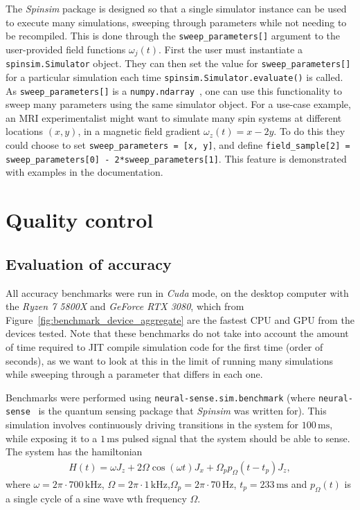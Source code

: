 \documentclass{jors}
\begin{document}
		The \emph{Spinsim} package is designed so that a single simulator instance can be used to execute many simulations, sweeping through parameters while not needing to be recompiled.
		This is done through the \texttt{sweep\_parameters[]} argument to the user-provided field functions $ \omega_j(t) $.
		First the user must instantiate a \texttt{spinsim.Simulator} object.
		They can then set the value for \texttt{sweep\_parameters[]} for a particular simulation each time \texttt{spinsim.Simulator.evaluate()} is called.
		As \texttt{sweep\_parameters[]} is a \texttt{numpy.ndarray}~\cite{harris_array_2020}, one can use this functionality to sweep many parameters using the same simulator object.
		For a use-case example, an MRI experimentalist might want to simulate many spin systems at different locations $ (x, y) $, in a magnetic field gradient $ \omega_z(t) = x - 2 y $.
		To do this they could choose to set \texttt{sweep\_parameters = [x, y]}, and define \texttt{field\_sample[2] = sweep\_parameters[0] - 2*sweep\_parameters[1]}.%
		This feature is demonstrated with examples in the documentation.

\section{Quality control}
	\subsection{Evaluation of accuracy}\label{sec:accuracy}
		All accuracy benchmarks were run in \emph{Cuda} mode, on the desktop computer with the \emph{Ryzen 7 5800X} and \emph{GeForce RTX 3080}, which from Figure~\ref{fig:benchmark_device_aggregate} are the fastest CPU and GPU from the devices tested.
		Note that these benchmarks do not take into account the amount of time required to JIT compile simulation code for the first time (order of seconds), as we want to look at this in the limit of running many simulations while sweeping through a parameter that differs in each one.
		
		Benchmarks were performed using \texttt{neural-sense.sim.benchmark} (where \texttt{neural-sense}~\cite{alexander-tritt-monash_alexander-tritt-monashneural-sense_2020} is the quantum sensing package that \emph{Spinsim} was written for).
		This simulation involves continuously driving transitions in the system for $ 100\,\mathrm{ms} $, while exposing it to a $ 1\,\mathrm{ms} $ pulsed signal that the system should be able to sense.
		The system has the hamiltonian
		\begin{align}
			H(t) = \omega J_z + 2\Omega\cos(\omega t)J_x + \Omega_p p_\Omega(t - t_p) J_z,\label{eq:neural_pulse}
		\end{align}
		where $ \omega = 2\pi\cdot700\,\mathrm{kHz} $, $ \Omega = 2\pi\cdot1\,\mathrm{kHz} $,$ \Omega_p = 2\pi\cdot70\,\mathrm{Hz} $, $ t_p = 233\,\mathrm{ms} $ and $ p_\Omega(t) $ is a single cycle of a sine wave wth frequency $ \Omega $.
\end{document}
